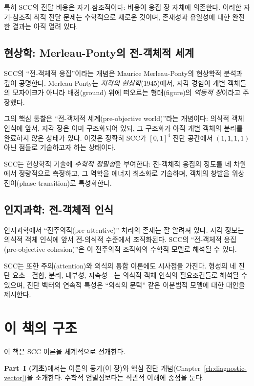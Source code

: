 특히 SCC의 전달 비용은 자기-참조적이다: 비용이 응집 장 자체에 의존한다. 이러한 자기-참조적 최적 전달 문제는 수학적으로 새로운 것이며, 존재성과 유일성에 대한 완전한 결과는 아직 열려 있다.


\subsection{현상학: Merleau-Ponty의 전-객체적 세계}

SCC의 ``전-객체적 응집''이라는 개념은 Maurice Merleau-Ponty의 현상학적 분석과 깊이 공명한다. Merleau-Ponty는 \textit{지각의 현상학}(1945)에서, 지각 경험이 개별 객체들의 모자이크가 아니라 배경(ground) 위에 떠오르는 형태(figure)의 \emph{역동적 장}이라고 주장했다.

그의 핵심 통찰은 ``전-객체적 세계(pre-objective world)''라는 개념이다: 의식적 객체 인식에 앞서, 지각 장은 이미 구조화되어 있되, 그 구조화가 아직 개별 객체의 분리를 완료하지 않은 상태가 있다. 이것은 정확히 SCC가 $[0,1]^4$ 진단 공간에서 $(1,1,1,1)$ 아닌 점들로 기술하고자 하는 상태이다.

SCC는 현상학적 기술에 \emph{수학적 정밀성}을 부여한다: 전-객체적 응집의 정도를 네 차원에서 정량적으로 측정하고, 그 역학을 에너지 최소화로 기술하며, 객체의 창발을 위상 전이(phase transition)로 특성화한다.


\subsection{인지과학: 전-객체적 인식}

인지과학에서 ``전주의적(pre-attentive)'' 처리의 존재는 잘 알려져 있다. 시각 정보는 의식적 객체 인식에 앞서 전-의식적 수준에서 조직화된다. SCC의 ``전-객체적 응집(pre-objective cohesion)''은 이 전주의적 조직화의 수학적 모델로 해석될 수 있다.

SCC는 또한 주의(attention)와 의식의 통합 이론에도 시사점을 가진다. 형성의 네 진단 요소---결합, 분리, 내부성, 지속성---는 의식적 객체 인식의 필요조건들로 해석될 수 있으며, 진단 벡터의 연속적 특성은 ``의식의 문턱'' 같은 이분법적 모델에 대한 대안을 제시한다.


\section{이 책의 구조}
\label{sec:book-roadmap}

이 책은 SCC 이론을 체계적으로 전개한다.

\textbf{Part~I (기초)}에서는 이론의 동기(이 장)와 핵심 진단 개념(Chapter~\ref{ch:diagnostic-vector})을 소개한다. 수학적 엄밀성보다는 직관적 이해에 중점을 둔다.

